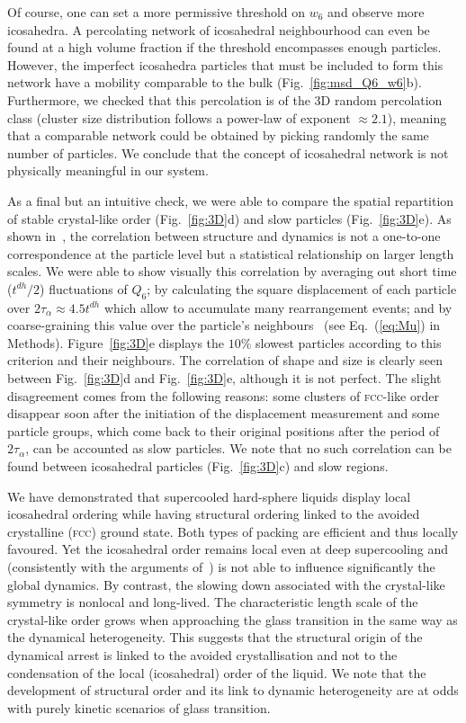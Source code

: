 Of course, one can set a more permissive threshold on $w_6$ and observe more icosahedra. A percolating network of icosahedral neighbourhood can even be found at a high volume fraction if the threshold encompasses enough particles. However, the imperfect icosahedra particles that must be included to form this network have a mobility comparable to the bulk (Fig.~\ref{fig:msd_Q6_w6}b). Furthermore, we checked that this percolation is of the 3D random percolation class (cluster size distribution follows a power-law of exponent $\approx 2.1$), meaning that a comparable network could be obtained by picking randomly the same number of particles. We conclude that the concept of icosahedral network is not physically meaningful in our system.

As a final but an intuitive check, we were able to compare the spatial repartition of stable crystal-like order (Fig.~\ref{fig:3D}d) and slow particles (Fig.~\ref{fig:3D}e). As shown in~\citep{Berthier2007}, the correlation between structure and dynamics is not a one-to-one correspondence at the particle level but a statistical relationship on larger length scales. We were able to show visually this correlation by averaging out short time ($t^{dh}/2$) fluctuations of $Q_6$; by calculating the square displacement of each particle over $2\tau_\alpha\approx 4.5t^{dh}$ which allow to accumulate many rearrangement events; and by coarse-graining this value over the particle's neighbours~\citep{Berthier2007} (see Eq.~(\ref{eq:Mu}) in Methods). Figure~\ref{fig:3D}e displays the $10\%$ slowest particles according to this criterion and their neighbours. The correlation of shape and size is clearly seen between Fig.~\ref{fig:3D}d and Fig.~\ref{fig:3D}e, although it is not perfect. The slight disagreement comes from the following reasons: some clusters of \textsc{fcc}-like order disappear soon after the initiation of the displacement measurement and some particle groups, which come back to their original positions after the period of $2\tau_\alpha$, can be accounted as slow particles. We note that no such correlation can be found between icosahedral particles (Fig.~\ref{fig:3D}c) and slow regions.



We have demonstrated that supercooled hard-sphere liquids display local icosahedral ordering while having structural ordering linked to the avoided crystalline (\textsc{fcc}) ground state. Both types of packing are efficient and thus locally favoured. Yet the icosahedral order remains local even at deep supercooling and (consistently with the arguments of~\citep{Berthier2007}) is not able to influence significantly the global dynamics. By contrast, the slowing down associated with the crystal-like symmetry is nonlocal and long-lived. The characteristic length scale of the crystal-like order grows when approaching the glass transition in the same way as the dynamical heterogeneity. This suggests that the structural origin of the dynamical arrest is linked to the avoided crystallisation and not to the condensation of the local (icosahedral) order of the liquid. We note that the development of structural order and its link to dynamic heterogeneity are at odds with purely kinetic scenarios of glass transition. 

